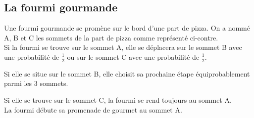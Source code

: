 \documentclass[oneside,12pt]{book}          %
\begin{document}
\subsection{La fourmi gourmande}

\begin{minipage}{0.6\linewidth}
    Une fourmi gourmande se promène sur le bord d'une part de pizza. On a nommé A, B et C les sommets de la part de pizza comme représenté ci-contre.\\[5pt]
    Si la fourmi se trouve sur le sommet A, elle se déplacera sur le sommet B avec une probabilité de $\frac{1}{2}$ ou sur le sommet C avec une probabilité de $\frac{1}{2}$.
    
    Si elle se situe sur le sommet B, elle choisit sa prochaine étape équiprobablement parmi les 3 sommets.
    
    Si elle se trouve sur le sommet C, la fourmi se rend toujours au sommet A.\\[5pt]
    La fourmi débute sa promenade de gourmet au sommet A.

\end{minipage}
\end{document}

